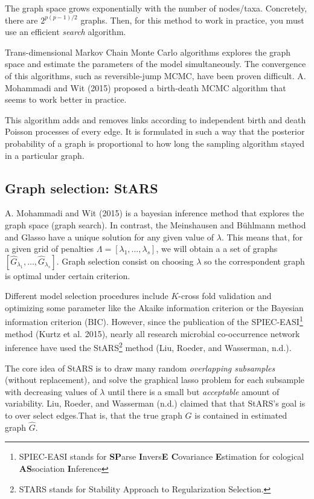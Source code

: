 \documentclass[
  letterpaper,
  DIV=11,
  numbers=noendperiod]{scrartcl}
\begin{document}
The graph space grows exponentially with the number of nodes/taxa.
Concretely, there are \(2^{p(p-1)/2}\) graphs. Then, for this method to
work in practice, you must use an efficient \emph{search} algorithm.

Trans-dimensional Markov Chain Monte Carlo algorithms explores the graph
space and estimate the parameters of the model simultaneously. The
convergence of this algorithms, such as reversible-jump MCMC, have been
proven difficult. A. Mohammadi and Wit (2015) proposed a birth-death
MCMC algorithm that seems to work better in practice.

This algorithm adds and removes links according to independent birth and
death Poisson processes of every edge. It is formulated in such a way
that the posterior probability of a graph is proportional to how long
the sampling algorithm stayed in a particular graph.

\hypertarget{graph-selection-stars}{%
\subsection{Graph selection: StARS}\label{graph-selection-stars}}

A. Mohammadi and Wit (2015) is a bayesian inference method that explores
the graph space (graph search). In contrast, the Meinshausen and
Bühlmann method and Glasso have a unique solution for any given value of
\(\lambda\). This means that, for a given grid of penalties
\(\Lambda=[\lambda_1, \dots, \lambda_s]\), we will obtain a a set of
graphs \([\hat G_{\lambda_1}, \dots, \hat G_{\lambda_s}]\). Graph
selection consist on choosing \(\lambda\) so the correspondent graph is
optimal under certain criterion.

Different model selection procedures include \(K\)-cross fold validation
and optimizing some parameter like the Akaike information criterion or
the Bayesian information criterion (BIC). However, since the publication
of the SPIEC-EASI\footnote{SPIEC-EASI stands for \textbf{SP}arse
  \textbf{I}nvers\textbf{E C}ovariance \textbf{E}stimation for cological
  \textbf{AS}sociation \textbf{I}nference} method (Kurtz et al. 2015),
nearly all research microbial co-occurrence network inference have used
the StARS\footnote{STARS stands for Stability Approach to Regularization
  Selection.} method (Liu, Roeder, and Wasserman, n.d.).

The core idea of StARS is to draw many random \emph{overlapping
subsamples} (without replacement)\emph{,} and solve the graphical lasso
problem for each subsample with decreasing values of \(\lambda\) until
there is a small but \emph{acceptable} amount of variability. Liu,
Roeder, and Wasserman (n.d.) claimed that that StARS's goal is to over
select edges.That is, that the true graph \(G\) is contained in
estimated graph \(\hat G\).
\end{document}
